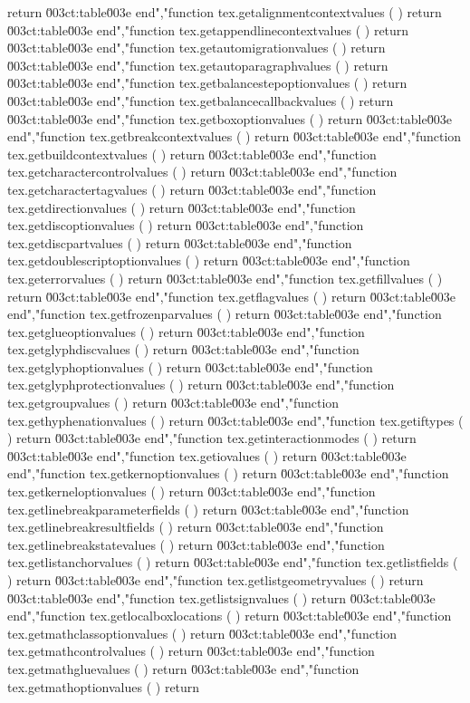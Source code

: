 return \u003ct:table\u003e end","function tex.getalignmentcontextvalues    ( ) return \u003ct:table\u003e end","function tex.getappendlinecontextvalues   ( ) return \u003ct:table\u003e end","function tex.getautomigrationvalues       ( ) return \u003ct:table\u003e end","function tex.getautoparagraphvalues       ( ) return \u003ct:table\u003e end","function tex.getbalancestepoptionvalues   ( ) return \u003ct:table\u003e end","function tex.getbalancecallbackvalues     ( ) return \u003ct:table\u003e end","function tex.getboxoptionvalues           ( ) return \u003ct:table\u003e end","function tex.getbreakcontextvalues        ( ) return \u003ct:table\u003e end","function tex.getbuildcontextvalues        ( ) return \u003ct:table\u003e end","function tex.getcharactercontrolvalues    ( ) return \u003ct:table\u003e end","function tex.getcharactertagvalues        ( ) return \u003ct:table\u003e end","function tex.getdirectionvalues           ( ) return \u003ct:table\u003e end","function tex.getdiscoptionvalues          ( ) return \u003ct:table\u003e end","function tex.getdiscpartvalues            ( ) return \u003ct:table\u003e end","function tex.getdoublescriptoptionvalues  ( ) return \u003ct:table\u003e end","function tex.geterrorvalues               ( ) return \u003ct:table\u003e end","function tex.getfillvalues                ( ) return \u003ct:table\u003e end","function tex.getflagvalues                ( ) return \u003ct:table\u003e end","function tex.getfrozenparvalues           ( ) return \u003ct:table\u003e end","function tex.getglueoptionvalues          ( ) return \u003ct:table\u003e end","function tex.getglyphdiscvalues           ( ) return \u003ct:table\u003e end","function tex.getglyphoptionvalues         ( ) return \u003ct:table\u003e end","function tex.getglyphprotectionvalues     ( ) return \u003ct:table\u003e end","function tex.getgroupvalues               ( ) return \u003ct:table\u003e end","function tex.gethyphenationvalues         ( ) return \u003ct:table\u003e end","function tex.getiftypes                   ( ) return \u003ct:table\u003e end","function tex.getinteractionmodes          ( ) return \u003ct:table\u003e end","function tex.getiovalues                  ( ) return \u003ct:table\u003e end","function tex.getkernoptionvalues          ( ) return \u003ct:table\u003e end","function tex.getkerneloptionvalues        ( ) return \u003ct:table\u003e end","function tex.getlinebreakparameterfields  ( ) return \u003ct:table\u003e end","function tex.getlinebreakresultfields     ( ) return \u003ct:table\u003e end","function tex.getlinebreakstatevalues      ( ) return \u003ct:table\u003e end","function tex.getlistanchorvalues          ( ) return \u003ct:table\u003e end","function tex.getlistfields                ( ) return \u003ct:table\u003e end","function tex.getlistgeometryvalues        ( ) return \u003ct:table\u003e end","function tex.getlistsignvalues            ( ) return \u003ct:table\u003e end","function tex.getlocalboxlocations         ( ) return \u003ct:table\u003e end","function tex.getmathclassoptionvalues     ( ) return \u003ct:table\u003e end","function tex.getmathcontrolvalues         ( ) return \u003ct:table\u003e end","function tex.getmathgluevalues            ( ) return \u003ct:table\u003e end","function tex.getmathoptionvalues          ( ) return 
